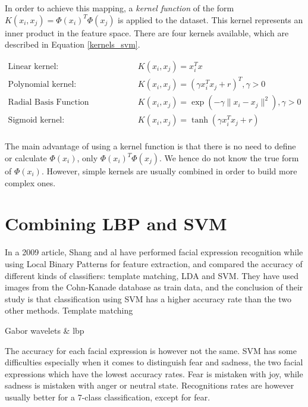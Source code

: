 \noindent In order to achieve this mapping, a \textit{kernel function} of the form $K(x_i, x_j) = \Phi(x_i)^T \Phi(x_j)$ is applied to the dataset. This kernel represents an inner product in the feature space. There are four kernels available, which are described in Equation \ref{kernels_svm}.
\newline

\begin{equation}
\begin{array}{ll}
	\text{Linear kernel:} & K(x_i,x_j) = x_i^Tx \\
	\text{Polynomial kernel:} & K(x_i,x_j) = (\gamma x_i^Tx_j + r)^T, \gamma > 0 \\
	\text{Radial Basis Function (Gaussian) kernel:} & K(x_i,x_j) = \exp(-\gamma \| x_i - x_j \|^2), \gamma > 0 \\
	\text{Sigmoid kernel:} & K(x_i,x_j) = \tanh(\gamma x_i^T x_j + r)\\
\end{array}
\label{kernels_svm}
\end{equation}

\vspace{\baselineskip}

\noindent The main advantage of using a kernel function is that there is no need to define or calculate $\Phi(x_i)$, only $\Phi(x_i)^T \Phi(x_j)$. We hence do not know the true form of $\Phi(x_i)$. However, simple kernels are usually combined in order to build more complex ones.
\newline

\section{Combining LBP and SVM}

\vspace{\baselineskip}
\noindent In a 2009 article, Shang and al \cite{SHA09} have performed facial expression recognition while using Local Binary Patterns for feature extraction, and compared the accuracy of different kinds of classifiers:  template matching,  LDA and SVM. They have used images from the Cohn-Kanade database as train data, and the conclusion of their study is that classification using SVM has a higher accuracy rate than the two other methods. Template matching 
\newline

\noindent Gabor wavelets \& lbp
\newline

\noindent The accuracy for each facial expression is however not the same. SVM has some difficulties especially when it comes to distinguish fear and sadness, the two facial expressions which have the lowest accuracy rates. Fear is mistaken with joy, while sadness is mistaken with anger or neutral state. Recognitions rates are however usually better for a 7-class classification, except for fear.
\newline

